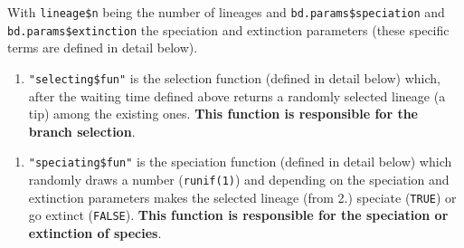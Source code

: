 \documentclass[
]{book}
\newenvironment{Shaded}{\begin{snugshade}}{\end{snugshade}}
\newcommand{\DecValTok}[1]{\textcolor[rgb]{0.00,0.00,0.81}{#1}}
\newcommand{\KeywordTok}[1]{\textcolor[rgb]{0.13,0.29,0.53}{\textbf{#1}}}
\newcommand{\NormalTok}[1]{#1}
\newcommand{\OperatorTok}[1]{\textcolor[rgb]{0.81,0.36,0.00}{\textbf{#1}}}
\newcommand{\StringTok}[1]{\textcolor[rgb]{0.31,0.60,0.02}{#1}}
\providecommand{\tightlist}{%
  \setlength{\itemsep}{0pt}\setlength{\parskip}{0pt}}
\begin{document}
\begin{Shaded}
\end{Shaded}

With \texttt{lineage\$n} being the number of lineages and \texttt{bd.params\$speciation} and \texttt{bd.params\$extinction} the speciation and extinction parameters (these specific terms are defined in detail below).

\begin{enumerate}
\def\labelenumi{\arabic{enumi}.}
\setcounter{enumi}{1}
\tightlist
\item
  \texttt{"selecting\$fun"} is the selection function (defined in detail below) which, after the waiting time defined above returns a randomly selected lineage (a tip) among the existing ones. \textbf{This function is responsible for the branch selection}.
\end{enumerate}

\begin{Shaded}
\end{Shaded}

\begin{enumerate}
\def\labelenumi{\arabic{enumi}.}
\setcounter{enumi}{2}
\tightlist
\item
  \texttt{"speciating\$fun"} is the speciation function (defined in detail below) which randomly draws a number (\texttt{runif(1)}) and depending on the speciation and extinction parameters makes the selected lineage (from 2.) speciate (\texttt{TRUE}) or go extinct (\texttt{FALSE}). \textbf{This function is responsible for the speciation or extinction of species}.
\end{enumerate}

\begin{Shaded}
\end{Shaded}
\end{document}
